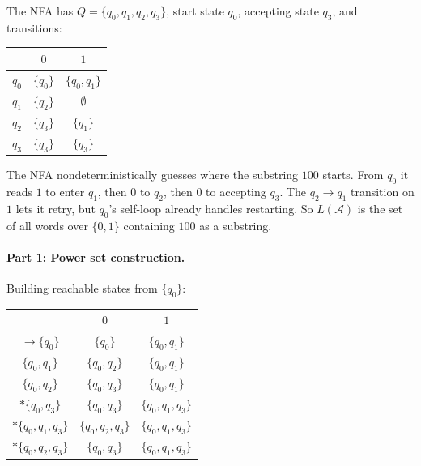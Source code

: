 \documentclass{article}
\theoremstyle{theorem}
\theoremstyle{definition}
\theoremstyle{remark}
\begin{document}
\begin{center}
\end{center}

The NFA has $Q = \{q_0, q_1, q_2, q_3\}$, start state $q_0$, accepting state $q_3$, and transitions:
\begin{center}
\begin{tabular}{c|cc}
 & $0$ & $1$ \\ \hline
$q_0$ & $\{q_0\}$ & $\{q_0, q_1\}$ \\
$q_1$ & $\{q_2\}$ & $\emptyset$ \\
$q_2$ & $\{q_3\}$ & $\{q_1\}$ \\
$q_3$ & $\{q_3\}$ & $\{q_3\}$ \\
\end{tabular}
\end{center}

The NFA nondeterministically guesses where the substring $100$ starts. From $q_0$ it reads $1$ to enter $q_1$, then $0$ to $q_2$, then $0$ to accepting $q_3$. The $q_2 \to q_1$ transition on $1$ lets it retry, but $q_0$'s self-loop already handles restarting. So $L(\mathcal{A})$ is the set of all words over $\{0,1\}$ containing $100$ as a substring.

\paragraph{Part 1: Power set construction.}
Building reachable states from $\{q_0\}$:

\begin{center}
\begin{tabular}{c|cc}
 & $0$ & $1$ \\ \hline
$\to \{q_0\}$ & $\{q_0\}$ & $\{q_0, q_1\}$ \\
$\{q_0, q_1\}$ & $\{q_0, q_2\}$ & $\{q_0, q_1\}$ \\
$\{q_0, q_2\}$ & $\{q_0, q_3\}$ & $\{q_0, q_1\}$ \\
$*\{q_0, q_3\}$ & $\{q_0, q_3\}$ & $\{q_0, q_1, q_3\}$ \\
$*\{q_0, q_1, q_3\}$ & $\{q_0, q_2, q_3\}$ & $\{q_0, q_1, q_3\}$ \\
$*\{q_0, q_2, q_3\}$ & $\{q_0, q_3\}$ & $\{q_0, q_1, q_3\}$ \\
\end{tabular}
\end{center}
\end{document}
